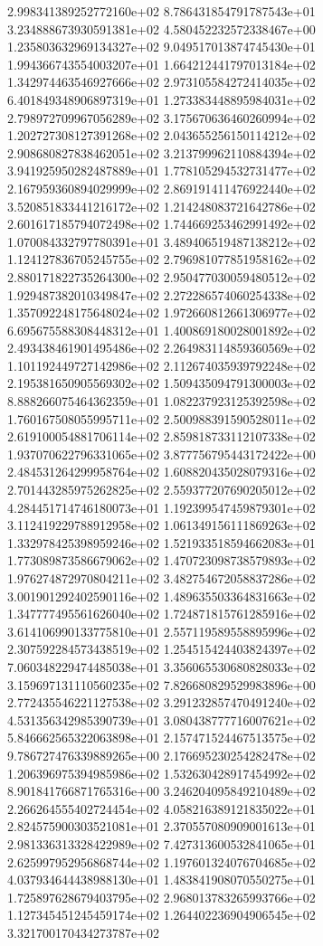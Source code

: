 2.998341389252772160e+02 8.786431854791787543e+01 3.234888673930591381e+02
4.580452232572338467e+00 1.235803632969134327e+02 9.049517013874745430e+01
1.994366743554003207e+01 1.664212441797013184e+02 1.342974463546927666e+02
2.973105584272414035e+02 6.401849348906897319e+01 1.273383448895984031e+02
2.798972709967056289e+02 3.175670636460260994e+02 1.202727308127391268e+02
2.043655256150114212e+02 2.908680827838462051e+02 3.213799962110884394e+02
3.941925950282487889e+01 1.778105294532731477e+02 2.167959360894029999e+02
2.869191411476922440e+02 3.520851833441216172e+02 1.214248083721642786e+02
2.601617185794072498e+02 1.744669253462991492e+02 1.070084332797780391e+01
3.489406519487138212e+02 1.124127836705245755e+02 2.796981077851958162e+02
2.880171822735264300e+02 2.950477030059480512e+02 1.929487382010349847e+02
2.272286574060254338e+02 1.357092248175648024e+02 1.972660812661306977e+02
6.695675588308448312e+01 1.400869180028001892e+02 2.493438461901495486e+02
2.264983114859360569e+02 1.101192449727142986e+02 2.112674035939792248e+02
2.195381650905569302e+02 1.509435094791300003e+02 8.888266075464362359e+01
1.082237923125392598e+02 1.760167508055995711e+02 2.500988391590528011e+02
2.619100054881706114e+02 2.859818733112107338e+02 1.937070622796331065e+02
3.877756795443172422e+00 2.484531264299958764e+02 1.608820435028079316e+02
2.701443285975262825e+02 2.559377207690205012e+02 4.284451714746180073e+01
1.192399547459879301e+02 3.112419229788912958e+02 1.061349156111869263e+02
1.332978425398959246e+02 1.521933518594662083e+01 1.773089873586679062e+02
1.470723098738579893e+02 1.976274872970804211e+02 3.482754672058837286e+02
3.001901292402590116e+02 1.489635503364831663e+02 1.347777495561626040e+02
1.724871815761285916e+02 3.614106990133775810e+01 2.557119589558895996e+02
2.307592284573438519e+02 1.254515424403824397e+02 7.060348229474485038e+01
3.356065530680828033e+02 3.159697131110560235e+02 7.826680829529983896e+00
2.772435546221127538e+02 3.291232857470491240e+02 4.531356342985390739e+01
3.080438777716007621e+02 5.846662565322063898e+01 2.157471524467513575e+02
9.786727476339889265e+00 2.176695230254282478e+02 1.206396975394985986e+02
1.532630428917454992e+02 8.901841766871765316e+00 3.246204095849210489e+02
2.266264555402724454e+02 4.058216389121835022e+01 2.824575900303521081e+01
2.370557080909001613e+01 2.981336313328422989e+02 7.427313600532841065e+01
2.625997952956868744e+02 1.197601324076704685e+02 4.037934644438988130e+01
1.483841908070550275e+01 1.725897628679403795e+02 2.968013783265993766e+02
1.127345451245459174e+02 1.264402236904906545e+02 3.321700170434273787e+02
